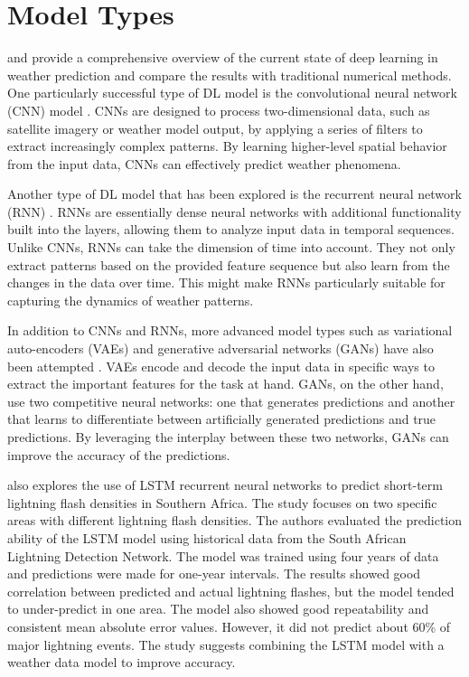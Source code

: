 \section{Model Types}

\textcite{bib4} and \textcite{new5} provide a comprehensive overview of the current state of deep learning in weather prediction and compare the results with traditional numerical methods. One particularly successful type of DL model is the convolutional neural network (CNN) model \cite{s40}. CNNs are designed to process two-dimensional data, such as satellite imagery or weather model output, by applying a series of filters to extract increasingly complex patterns. By learning higher-level spatial behavior from the input data, CNNs can effectively predict weather phenomena.

Another type of DL model that has been explored is the recurrent neural network (RNN) \cite{s43} \cite{s44} \cite{s45}. RNNs are essentially dense neural networks with additional functionality built into the layers, allowing them to analyze input data in temporal sequences. Unlike CNNs, RNNs can take the dimension of time into account. They not only extract patterns based on the provided feature sequence but also learn from the changes in the data over time. This might make RNNs particularly suitable for capturing the dynamics of weather patterns.

In addition to CNNs and RNNs, more advanced model types such as variational auto-encoders (VAEs) and generative adversarial networks (GANs) have also been attempted \cite{s47} \cite{s48}. VAEs encode and decode the input data in specific ways to extract the important features for the task at hand. GANs, on the other hand, use two competitive neural networks: one that generates predictions and another that learns to differentiate between artificially generated predictions and true predictions. By leveraging the interplay between these two networks, GANs can improve the accuracy of the predictions.

\textcite{new2} also explores the use of LSTM recurrent neural networks to predict short-term lightning flash densities in Southern Africa. The study focuses on two specific areas with different lightning flash densities. The authors evaluated the prediction ability of the LSTM model using historical data from the South African Lightning Detection Network. The model was trained using four years of data and predictions were made for one-year intervals. The results showed good correlation between predicted and actual lightning flashes, but the model tended to under-predict in one area. The model also showed good repeatability and consistent mean absolute error values. However, it did not predict about 60\% of major lightning events. The study suggests combining the LSTM model with a weather data model to improve accuracy.

